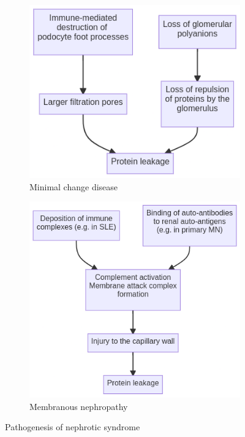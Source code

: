 \documentclass[
  12pt,
]{memoir}
\begin{document}
\begin{figure}[h!]
    \centering
    \begin{subfigure}{.45\textwidth}
        \includegraphics[width=\textwidth]{../assets/med/nephrotic-mcd.png}
        \caption{Minimal change disease}
    \end{subfigure}\hfill
    \begin{subfigure}{.45\textwidth}
        \includegraphics[width=\textwidth]{../assets/med/nephrotic-mn.png}
        \caption{Membranous nephropathy}
    \end{subfigure}
    \vspace{5mm}
    \caption{Pathogenesis of nephrotic syndrome}
\end{figure}
\end{document}
